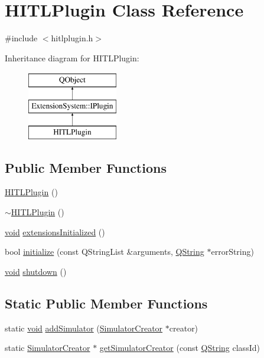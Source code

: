 \hypertarget{class_h_i_t_l_plugin}{\section{H\-I\-T\-L\-Plugin Class Reference}
\label{class_h_i_t_l_plugin}
}


{\ttfamily \#include $<$hitlplugin.\-h$>$}

Inheritance diagram for H\-I\-T\-L\-Plugin\-:\begin{figure}[H]
\begin{center}
\leavevmode
\includegraphics[height=3.000000cm]{class_h_i_t_l_plugin}
\end{center}
\end{figure}
\subsection*{Public Member Functions}
\begin{DoxyCompactItemize}
\item 
\hyperlink{group___h_i_t_l_plugin_ga0f1bfd313d4d0d404f51e34d8dbaacc5}{H\-I\-T\-L\-Plugin} ()
\item 
\hyperlink{group___h_i_t_l_plugin_ga371454242ad0b7e52024243ec91c7d13}{$\sim$\-H\-I\-T\-L\-Plugin} ()
\item 
\hyperlink{group___u_a_v_objects_plugin_ga444cf2ff3f0ecbe028adce838d373f5c}{void} \hyperlink{group___h_i_t_l_plugin_ga30d63de205d36f5e637e17ae3efb35cd}{extensions\-Initialized} ()
\item 
bool \hyperlink{group___h_i_t_l_plugin_ga113a69fc6f312ce4658d3c6266e3545f}{initialize} (const Q\-String\-List \&arguments, \hyperlink{group___u_a_v_objects_plugin_gab9d252f49c333c94a72f97ce3105a32d}{Q\-String} $\ast$error\-String)
\item 
\hyperlink{group___u_a_v_objects_plugin_ga444cf2ff3f0ecbe028adce838d373f5c}{void} \hyperlink{group___h_i_t_l_plugin_gadc35670ca57c30770f97bf6e95e9297b}{shutdown} ()
\end{DoxyCompactItemize}
\subsection*{Static Public Member Functions}
\begin{DoxyCompactItemize}
\item 
static \hyperlink{group___u_a_v_objects_plugin_ga444cf2ff3f0ecbe028adce838d373f5c}{void} \hyperlink{group___h_i_t_l_plugin_ga54ec8bdd017e6c77dc8f88009474d78e}{add\-Simulator} (\hyperlink{class_simulator_creator}{Simulator\-Creator} $\ast$creator)
\item 
static \hyperlink{class_simulator_creator}{Simulator\-Creator} $\ast$ \hyperlink{group___h_i_t_l_plugin_gad74c7b21a8be7419684135b3f0498b01}{get\-Simulator\-Creator} (const \hyperlink{group___u_a_v_objects_plugin_gab9d252f49c333c94a72f97ce3105a32d}{Q\-String} class\-Id)
\end{DoxyCompactItemize}
